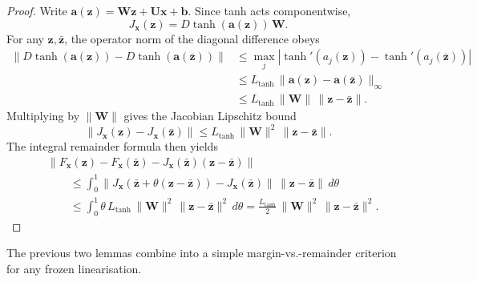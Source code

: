 \documentclass{article}
\theoremstyle{remark}
\newcommand{\bz}{\mathbf{z}}
\newcommand{\bx}{\mathbf{x}}
\newcommand{\bW}{\mathbf{W}}
\newcommand{\bU}{\mathbf{U}}
\begin{document}
\begin{proof}
Write $\mathbf{a}(\bz) = \bW\bz + \bU\bx + \mathbf{b}$. Since tanh acts
componentwise,
\[
  J_{\bx}(\bz) = D\tanh(\mathbf{a}(\bz))\,\bW.
\]
For any $\bz,\bar{\bz}$, the operator norm of the diagonal difference obeys
\begin{align*}
  \|D\tanh(\mathbf{a}(\bz)) - D\tanh(\mathbf{a}(\bar{\bz}))\|
  &\leq \max_j |\tanh'(a_j(\bz)) - \tanh'(a_j(\bar{\bz}))| \\
  &\leq L_{\tanh}\,\|\mathbf{a}(\bz) - \mathbf{a}(\bar{\bz})\|_\infty \\
  &\leq L_{\tanh}\,\|\bW\|\,\|\bz - \bar{\bz}\|.
\end{align*}
Multiplying by $\|\bW\|$ gives the Jacobian Lipschitz bound
\[
  \|J_{\bx}(\bz) - J_{\bx}(\bar{\bz})\|
  \leq L_{\tanh}\,\|\bW\|^2\,\|\bz - \bar{\bz}\|.
\]
The integral remainder formula then yields
\begin{align*}
  &\|F_{\bx}(\bz) - F_{\bx}(\bar{\bz})
  - J_{\bx}(\bar{\bz})(\bz - \bar{\bz})\| \\
  &\qquad\leq \int_0^1
  \|J_{\bx}(\bar{\bz} + \theta(\bz-\bar{\bz})) - J_{\bx}(\bar{\bz})\|
  \,\|\bz-\bar{\bz}\|\,d\theta \\
  &\qquad\leq \int_0^1
  \theta\,L_{\tanh}\,\|\bW\|^2\,\|\bz-\bar{\bz}\|^2\,d\theta
  = \frac{L_{\tanh}}{2}\,\|\bW\|^2\,\|\bz-\bar{\bz}\|^2.
\end{align*}
\end{proof}

The previous two lemmas combine into a simple margin-vs.-remainder criterion
for any frozen linearisation.
\end{document}
